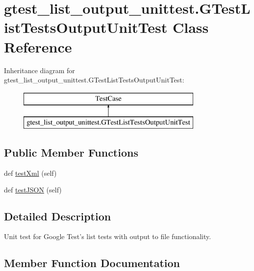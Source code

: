 \hypertarget{classgtest__list__output__unittest_1_1GTestListTestsOutputUnitTest}{}\section{gtest\+\_\+list\+\_\+output\+\_\+unittest.\+G\+Test\+List\+Tests\+Output\+Unit\+Test Class Reference}
\label{classgtest__list__output__unittest_1_1GTestListTestsOutputUnitTest}
Inheritance diagram for gtest\+\_\+list\+\_\+output\+\_\+unittest.\+G\+Test\+List\+Tests\+Output\+Unit\+Test\+:\begin{figure}[H]
\begin{center}
\leavevmode
\includegraphics[height=2.000000cm]{classgtest__list__output__unittest_1_1GTestListTestsOutputUnitTest}
\end{center}
\end{figure}
\subsection*{Public Member Functions}
\begin{DoxyCompactItemize}
\item 
def \mbox{\hyperlink{classgtest__list__output__unittest_1_1GTestListTestsOutputUnitTest_ad3088bc8ee3a0abdabbf1b90507e272e}{test\+Xml}} (self)
\item 
def \mbox{\hyperlink{classgtest__list__output__unittest_1_1GTestListTestsOutputUnitTest_a99bc0627a969b4c7b63ed91e8f187637}{test\+J\+S\+ON}} (self)
\end{DoxyCompactItemize}


\subsection{Detailed Description}
\begin{DoxyVerb}Unit test for Google Test's list tests with output to file functionality.\end{DoxyVerb}
 

\subsection{Member Function Documentation}
\mbox{\label{classgtest__list__output__unittest_1_1GTestListTestsOutputUnitTest_a99bc0627a969b4c7b63ed91e8f187637}} 
